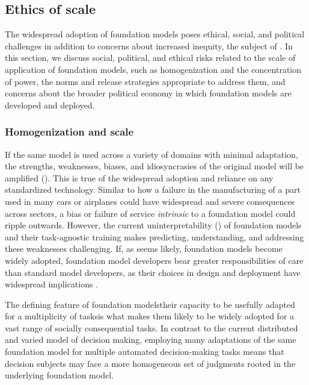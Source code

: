 \newsection
\subsection{Ethics of scale}
\label{sec:ethics}

The widespread adoption of foundation models poses ethical, social, and political challenges in addition to concerns about increased inequity, the subject of . 
In this section, we discuss social, political, and ethical risks  related to the scale of application of foundation models, such as homogenization and the concentration of power, the norms and release strategies appropriate to address them, and concerns about the broader political economy in which foundation models are developed and deployed. 

\subsubsection{Homogenization and scale} 
 
If the same model is used across a variety of domains with minimal adaptation, the strengths, weaknesses, biases, and idiosyncrasies of the original model will be amplified (). 
This is true of the widespread adoption and reliance on any standardized technology. 
Similar to how a failure in the manufacturing of a part used in many cars or airplanes could have widespread and severe consequences across sectors, a bias or failure of service \textit{intrinsic} to a foundation model could ripple outwards. 
However, the current uninterpretability () of foundation models and their task-agnostic training makes predicting, understanding, and addressing these weaknesses challenging.  
If, as seems likely, foundation models become widely adopted, foundation model developers bear greater responsibilities of care than standard model developers, as their choices in design and deployment  have widespread implications \citep{Arendt1987}. 

The defining feature of foundation models\dash{}their capacity to be usefully adapted for a multiplicity of tasks\dash{}is what makes them likely to be widely adopted for a vast range of socially consequential tasks. 
In contrast to the current distributed and varied model of decision making, employing many adaptations of the same foundation model for multiple automated decision-making tasks means that decision subjects may face a more homogeneous set of judgments rooted in the underlying foundation model. 

